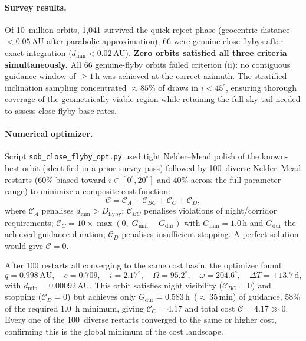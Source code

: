 \documentclass[11pt,a4paper]{article}
\begin{document}
\paragraph{Survey results.}
Of 10~million orbits, 1{,}041 survived the quick-reject phase (geocentric
distance $< 0.05$\,AU after parabolic approximation); 66 were genuine close
flybys after exact integration ($d_\mathrm{min} < 0.02$\,AU).
\textbf{Zero orbits satisfied all three criteria simultaneously.}
All 66 genuine-flyby orbits failed criterion (ii): no contiguous guidance
window of $\geq 1$\,h was achieved at the correct azimuth. The stratified
inclination sampling concentrated $\approx\!85\%$ of draws in $i < 45^\circ$,
ensuring thorough coverage of the geometrically viable region while retaining
the full-sky tail needed to assess close-flyby base rates.

\paragraph{Numerical optimizer.}
Script \texttt{sob\_close\_flyby\_opt.py} used tight Nelder--Mead polish of
the known-best orbit (identified in a prior survey pass) followed by
100~diverse Nelder--Mead restarts (60\% biased toward $i\!\in\![0^\circ,20^\circ]$
and 40\% across the full parameter range) to minimize a composite cost function:
\begin{equation}
  \mathcal{C} = \mathcal{C}_A + \mathcal{C}_{BC} + \mathcal{C}_C + \mathcal{C}_D,
\end{equation}
where $\mathcal{C}_A$ penalises $d_\mathrm{min} > D_\mathrm{flyby}$;
$\mathcal{C}_{BC}$ penalises violations of night/corridor requirements;
$\mathcal{C}_C = 10 \times \max(0,\; G_\mathrm{min} - G_\mathrm{dur})$
with $G_\mathrm{min} = 1.0$\,h and $G_\mathrm{dur}$ the achieved guidance
duration; $\mathcal{C}_D$ penalises insufficient stopping. A perfect solution
would give $\mathcal{C} = 0$.

After 100 restarts all converging to the same cost basin, the optimizer found:
\begin{equation}
  q = 0.998\,\mathrm{AU},\quad e = 0.709,\quad i = 2.17^\circ,\quad
  \Omega = 95.2^\circ,\quad \omega = 204.6^\circ,\quad \Delta T = +13.7\,\mathrm{d},
\end{equation}
with $d_\mathrm{min} = 0.00092$\,AU. This orbit satisfies night visibility
($\mathcal{C}_{BC} = 0$) and stopping ($\mathcal{C}_D = 0$) but achieves only
$G_\mathrm{dur} = 0.583$\,h~(${\approx}\,35$\,min) of guidance, 58\% of the
required 1.0~h minimum, giving $\mathcal{C}_C = 4.17$ and total cost
$\mathcal{C} = 4.17 \gg 0$. Every one of the 100~diverse restarts converged
to the same or higher cost, confirming this is the global minimum of the
cost landscape.
\end{document}
